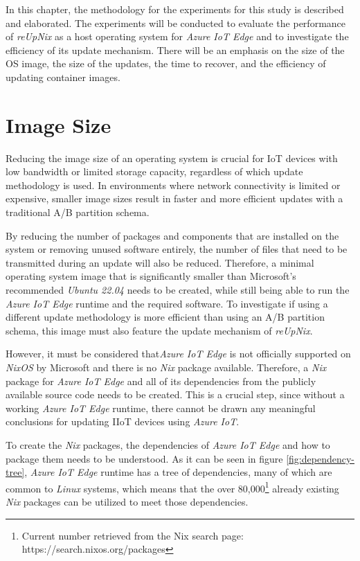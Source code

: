 
In this chapter, the methodology for the experiments for this study
is described and elaborated. The experiments will be conducted to evaluate the performance of
\textit{reUpNix} as a host
operating system for \textit{Azure IoT Edge} and to investigate the efficiency
of its update mechanism. There will be an emphasis on the size of the \ac{OS}
image, the size of the updates, the time to recover, and the efficiency of
updating container images.

\section{Image Size}
\label{sec:image-size}
Reducing the image size of an operating system is crucial for \ac{IoT} devices
with low bandwidth or limited storage capacity, regardless of which update
methodology is used. In environments where network connectivity is limited or expensive,
smaller image sizes result in faster and more efficient updates with a traditional
A/B partition schema.

By reducing the number of packages and components that are installed on the
system or removing unused software entirely, the number of files that need to
be transmitted during an update will also be reduced. Therefore,
a minimal operating system image that is significantly smaller
than Microsoft's recommended \textit{Ubuntu 22.04} needs to be created, while
still being able to run the
\textit{Azure IoT Edge} runtime and the required software. To investigate if using
a different update methodology is more efficient than using an A/B partition schema,
this image must also feature the update mechanism of \textit{reUpNix}.

However, it must be considered that\textit{Azure IoT Edge} is not officially
supported on \textit{NixOS}
by Microsoft and there is no \textit{Nix} package available. Therefore, a \textit{Nix} package
for \textit{Azure IoT Edge} and all of its dependencies from the publicly available source code
needs to be created. This is a crucial step, since
without a working \textit{Azure IoT Edge} runtime, there cannot be drawn any meaningful
conclusions for updating \ac{IIoT} devices using \textit{Azure IoT}.

To create the \textit{Nix} packages, the dependencies of
\textit{Azure IoT Edge} and how to package them needs to be understood.
As it can be seen in figure
\ref{fig:dependency-tree}, \textit{Azure IoT Edge} runtime has a tree of dependencies,
many of which are common to \textit{Linux} systems, which means that the over
80,000\footnote{Current number retrieved from the Nix search page: https://search.nixos.org/packages}
already existing \textit{Nix} packages can be utilized to meet those dependencies.

